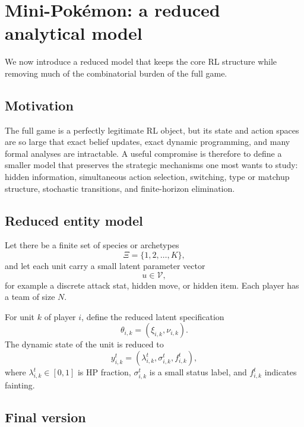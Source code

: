 \documentclass[aps,pre,twocolumn,superscriptaddress,nofootinbib]{revtex4-2}
\newcommand{\cV}{\mathcal{V}}
\theoremstyle{definition}
\theoremstyle{plain}
\begin{document}
\section{Mini-Pok\'emon: a reduced analytical model}
\label{sec:minipokemon}

We now introduce a reduced model that keeps the core RL structure while removing much of the combinatorial burden of the full game.

\subsection{Motivation}

The full game is a perfectly legitimate RL object, but its state and action spaces are so large that exact belief updates, exact dynamic programming, and many formal analyses are intractable. A useful compromise is therefore to define a smaller model that preserves the strategic mechanisms one most wants to study: hidden information, simultaneous action selection, switching, type or matchup structure, stochastic transitions, and finite-horizon elimination.

\subsection{Reduced entity model}

Let there be a finite set of species or archetypes
\begin{equation}
    \Xi = \{1,2,\dots,K\},
\end{equation}
and let each unit carry a small latent parameter vector
\begin{equation}
    u \in \cV,
\end{equation}
for example a discrete attack stat, hidden move, or hidden item. Each player has a team of size $N$.

For unit $k$ of player $i$, define the reduced latent specification
\begin{equation}
    \theta_{i,k} = (\xi_{i,k},\nu_{i,k}).
\end{equation}
The dynamic state of the unit is reduced to
\begin{equation}
    y_{i,k}^t = (\lambda_{i,k}^t,\sigma_{i,k}^t,f_{i,k}^t),
\end{equation}
where $\lambda_{i,k}^t \in [0,1]$ is HP fraction, $\sigma_{i,k}^t$ is a small status label, and $f_{i,k}^t$ indicates fainting.

\subsection{Final version}
\end{document}
